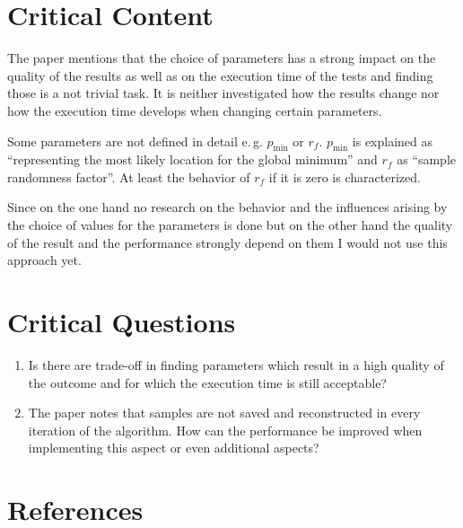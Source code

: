 \documentclass[oneside, notitlepage, twocolumn]{scrartcl}
\newcommand{\eg}{e.\,g.\xspace}
\begin{document}
\section{Critical Content}
The paper mentions that the choice of parameters has a strong impact on the quality of the results as well as on the execution time of the tests and finding those is a not trivial task.
It is neither investigated how the results change nor how the execution time develops when changing certain parameters.\par
Some parameters are not defined in detail \eg{} \(p_\min\) or \(r_f\).
\(p_\min\) is explained as ``representing the most likely location for the global minimum'' and \(r_f\) as ``sample randomness factor''.
At least the behavior of \(r_f\) if it is zero is characterized.\par
Since on the one hand no research on the behavior and the influences arising by the choice of values for the parameters is done but on the other hand the quality of the result and the performance strongly depend on them I would not use this approach yet.

\section{Critical Questions}
\begin{enumerate}
    \item Is there are trade-off in finding parameters which result in a high quality of the outcome and for which the execution time is still acceptable?
    \item The paper notes that samples are not saved and reconstructed in every iteration of the algorithm.
        How can the performance be improved when implementing this aspect or even additional aspects?
\end{enumerate}

\printglossary[type=\acronymtype, title=List of Abbreviations]

\section{References}
\begingroup
\renewcommand{\section}[2]{}%
\nocite{*}
\printbibliography%
\endgroup
\end{document}
